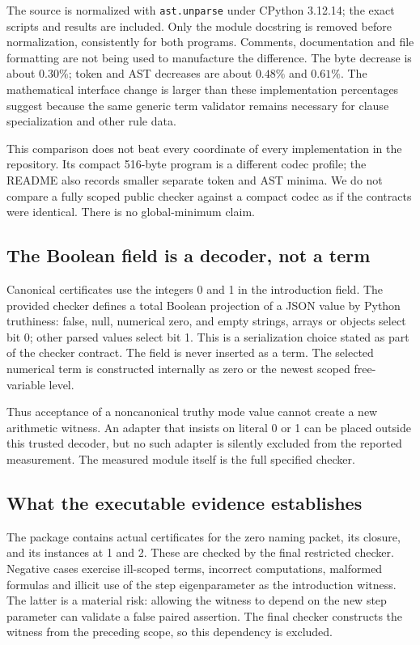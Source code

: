 \documentclass[11pt,letterpaper]{article}
\theoremstyle{definition}
\theoremstyle{remark}
\begin{document}
The source is normalized with \texttt{ast.unparse} under CPython 3.12.14;
the exact scripts and results are included. Only the module docstring is
removed before normalization, consistently for both programs. Comments, documentation and
file formatting are not being used to manufacture the difference. The
byte decrease is about $0.30\%$; token and AST decreases are about
$0.48\%$ and $0.61\%$. The mathematical interface change is larger than
these implementation percentages suggest because the same generic term
validator remains necessary for clause specialization and other rule data.

This comparison does not beat every coordinate of every implementation
in the repository. Its compact 516-byte program is a different codec
profile; the README also records smaller separate token and AST minima.
We do not compare a fully scoped public checker against a compact codec
as if the contracts were identical. There is no global-minimum claim.

\subsection{The Boolean field is a decoder, not a term}

Canonical certificates use the integers 0 and 1 in the introduction
field. The provided checker defines a total Boolean projection of a JSON
value by Python truthiness: false, null, numerical zero, and empty
strings, arrays or objects select bit 0; other parsed values select bit 1.
This is a serialization choice stated as part of the checker contract.
The field is never inserted as a term. The selected numerical term is
constructed internally as zero or the newest scoped free-variable level.

Thus acceptance of a noncanonical truthy mode value cannot create a
new arithmetic witness. An adapter that insists on literal 0 or 1 can
be placed outside this trusted decoder, but no such adapter is silently
excluded from the reported measurement. The measured module itself is
the full specified checker.

\subsection{What the executable evidence establishes}

The package contains actual certificates for the zero naming packet,
its closure, and its instances at 1 and 2. These are checked by the
final restricted checker. Negative cases exercise ill-scoped terms,
incorrect computations, malformed formulas and illicit use of the step
eigenparameter as the introduction witness. The latter is a material
risk: allowing the witness to depend on the new step parameter can
validate a false paired assertion. The final checker constructs the
witness from the preceding scope, so this dependency is excluded.
\end{document}
